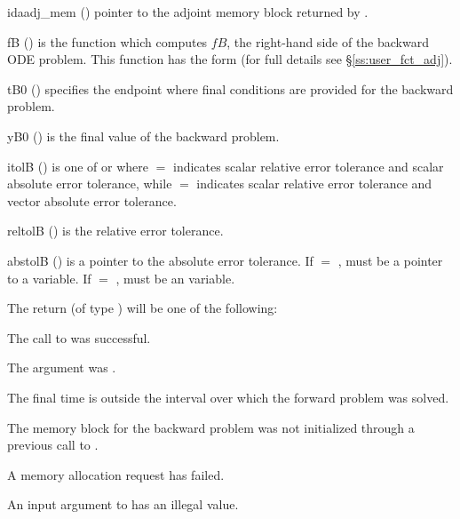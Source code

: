 {
  \begin{args}
  \item[idaadj\_mem] ()
    pointer to the adjoint memory block returned by .
  \item[fB] ()
    is the {\C} function which computes $fB$, the right-hand side of the 
    backward ODE problem. This function has the form 
     (for full details see \S\ref{ss:user_fct_adj}).
  \item[tB0] ()
    specifies the endpoint where final conditions are provided for the 
    backward problem.
  \item[yB0] ()
    is the final value of the backward problem. 
  \item[itolB] () 
    is one of  or   where $=$ indicates scalar relative error 
    tolerance and scalar absolute error tolerance, while $=$ indicates scalar
    relative error tolerance and vector absolute error tolerance. 
  \item[reltolB] ()
    is the relative error tolerance.
  \item[abstolB] ()
    is a pointer to the absolute error tolerance. If  $=$ , 
    must be a pointer to a  variable. If  $=$ , 
    must be an  variable.
  \end{args}
}
{
  The return  (of type ) will be one of the following:
  \begin{args}
  \item[\Id{IDA\_SUCCESS}]
    The call to  was successful.
  \item[\Id{IDA\_ADJMEM\_NULL}]
    The  argument was .
  \item[\Id{IDA\_BAD\_TB0}]
    The final time  is outside the interval over which the forward problem
    was solved.
  \item[\Id{IDA\_MEM\_NULL}] 
    The {\idas} memory block for the backward problem was not initialized through 
    a previous call to .
  \item[\Id{IDA\_MEM\_FAIL}] 
    A memory allocation request has failed.
  \item[\Id{IDA\_ILL\_INPUT}] 
    An input argument to  has an illegal value.
  \end{args}
}
